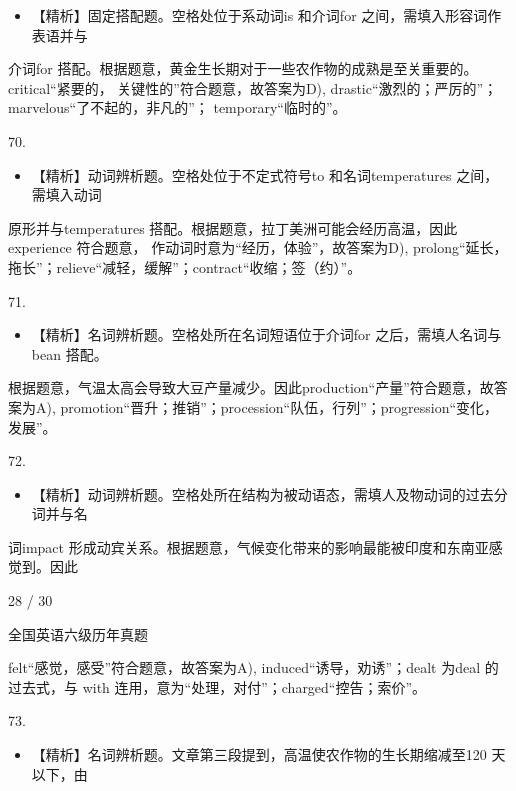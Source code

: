 \documentclass[UTF8,11pt]{ctexart}
\begin{document}
\begin{itemize}[leftmargin=2em,itemsep=.2em,topsep=.4em]\item[D.] 【精析】固定搭配题。空格处位于系动词is 和介词for 之间，需填入形容词作表语并与
\end{itemize}

介词for 搭配。根据题意，黄金生长期对于一些农作物的成熟是至关重要的。critical“紧要的， 关键性的”符合题意，故答案为D), drastic“激烈的；严厉的”；marvelous“了不起的，非凡的”； temporary“临时的”。


70.


\begin{itemize}[leftmargin=2em,itemsep=.2em,topsep=.4em]\item[D.] 【精析】动词辨析题。空格处位于不定式符号to 和名词temperatures 之间，需填入动词
\end{itemize}

原形并与temperatures 搭配。根据题意，拉丁美洲可能会经历高温，因此experience 符合题意， 作动词时意为“经历，体验”，故答案为D), prolong“延长，拖长”；relieve“减轻，缓解”；contract“收缩；签（约）”。


71.


\begin{itemize}[leftmargin=2em,itemsep=.2em,topsep=.4em]\item[D.] 【精析】名词辨析题。空格处所在名词短语位于介词for 之后，需填人名词与bean 搭配。
\end{itemize}

根据题意，气温太高会导致大豆产量减少。因此production“产量”符合题意，故答案为A), promotion“晋升；推销”；procession“队伍，行列”；progression“变化，发展”。


72.


\begin{itemize}[leftmargin=2em,itemsep=.2em,topsep=.4em]\item[A.] 【精析】动词辨析题。空格处所在结构为被动语态，需填人及物动词的过去分词并与名
\end{itemize}

词impact 形成动宾关系。根据题意，气候变化带来的影响最能被印度和东南亚感觉到。因此


28 / 30


全国英语六级历年真题


felt“感觉，感受”符合题意，故答案为A), induced“诱导，劝诱”；dealt 为deal 的过去式，与 with 连用，意为“处理，对付”；charged“控告；索价”。


73.


\begin{itemize}[leftmargin=2em,itemsep=.2em,topsep=.4em]\item[C.] 【精析】名词辨析题。文章第三段提到，高温使农作物的生长期缩减至120 天以下，由
\end{itemize}
\end{document}
